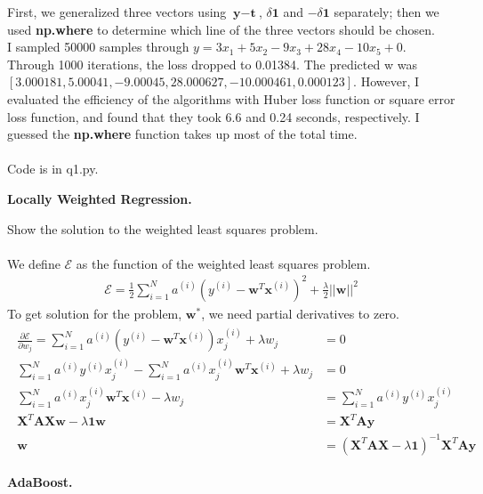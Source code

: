 \documentclass{myhw}
\begin{document}
\begin{homeworkProblem}
\begin{homeworkSection}
First, we generalized three vectors using $\textbf{y}-\textbf{t}$, $\delta \textbf{1}$ and $-\delta \textbf{1}$ separately; 
then we used \textbf{np.where} to determine which line of the three vectors should be chosen.
\\
I sampled 50000 samples through $y=3x_1 + 5x_2 - 9x_3 + 28x_4 -10x_5 + 0$. Through 1000 iterations, the loss dropped to 0.01384. The predicted w was $[3.000181, 5.00041, -9.00045, 28.000627, -10.000461, 0.000123]$. However, I evaluated the efficiency of the algorithms with Huber loss function or square error loss function, and found that they took 6.6 and 0.24 seconds, respectively. I guessed the \textbf{np.where} function takes up most of the total time.
\\
\\
Code is in q1.py.
\end{homeworkSection}
\end{homeworkProblem}


\begin{homeworkProblem}
\textbf{Locally Weighted Regression.}
\begin{homeworkSection}
Show the solution to the weighted least squares problem. \\
\\
We define $\mathscr{E}$ as the function of the weighted least squares problem.
\begin{gather*}
\mathscr{E} = \frac{1}{2} \sum_{i=1}^N{a^{(i)} (y^{(i)} - \textbf{w}^T \textbf{x}^{(i)})^2} + \frac{\lambda}{2} ||\textbf{w}||^2
\end{gather*}
To get solution for the problem, $\textbf{w}^*$, we need partial derivatives to zero.
\begin{gather*}
\begin{aligned}
\frac{\partial \mathscr{E}}{\partial w_j} = \sum_{i=1}^N{a^{(i)} (y^{(i)} - \textbf{w}^T \textbf{x}^{(i)})x_j^{(i)}} + \lambda w_j & = 0 \\
\sum_{i=1}^N{a^{(i)} y^{(i)} x_j^{(i)}} - \sum_{i=1}^N{a^{(i)} x_j^{(i)} \textbf{w}^T \textbf{x}^{(i)}} + \lambda w_j & = 0 \\
\sum_{i=1}^N{a^{(i)} x_j^{(i)} \textbf{w}^T \textbf{x}^{(i)}} - \lambda w_j & = \sum_{i=1}^N{a^{(i)} y^{(i)} x_j^{(i)}} \\
\textbf{X}^T \textbf{AXw} - \lambda \textbf{1w} & = \textbf{X}^T \textbf{Ay} \\
\textbf{w} & = (\textbf{X}^T \textbf{AX} - \lambda \textbf{1})^{-1} \textbf{X}^T \textbf{Ay}
\end{aligned}
\end{gather*}
\end{homeworkSection}
\begin{homeworkSection}

\end{homeworkSection}
\begin{homeworkSection}

\end{homeworkSection}
\end{homeworkProblem}


\begin{homeworkProblem}
\textbf{AdaBoost.} \\
\\

\end{homeworkProblem}
\end{document}
